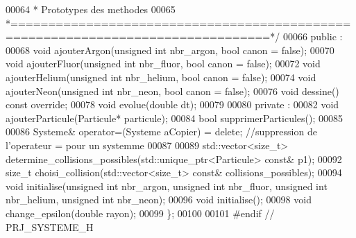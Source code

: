 \begin{DoxyCode}
00064 \textcolor{comment}{ * Prototypes des methodes}
00065 \textcolor{comment}{ *================================================================================*/}
00066     \textcolor{keyword}{public} :
00068     \textcolor{keywordtype}{void} ajouterArgon(\textcolor{keywordtype}{unsigned} \textcolor{keywordtype}{int} nbr\_argon, \textcolor{keywordtype}{bool} canon = \textcolor{keyword}{false});
00070     \textcolor{keywordtype}{void} ajouterFluor(\textcolor{keywordtype}{unsigned} \textcolor{keywordtype}{int} nbr\_fluor, \textcolor{keywordtype}{bool} canon = \textcolor{keyword}{false});
00072     \textcolor{keywordtype}{void} ajouterHelium(\textcolor{keywordtype}{unsigned} \textcolor{keywordtype}{int} nbr\_helium, \textcolor{keywordtype}{bool} canon = \textcolor{keyword}{false});
00074     \textcolor{keywordtype}{void} ajouterNeon(\textcolor{keywordtype}{unsigned} \textcolor{keywordtype}{int} nbr\_neon, \textcolor{keywordtype}{bool} canon = \textcolor{keyword}{false});
00076     \textcolor{keywordtype}{void} dessine() \textcolor{keyword}{const override};
00078     \textcolor{keywordtype}{void} evolue(\textcolor{keywordtype}{double} dt);
00079 
00080     \textcolor{keyword}{private} :
00082     \textcolor{keywordtype}{void} ajouterParticule(Particule* particule);
00084     \textcolor{keywordtype}{bool} supprimerParticules();
00085     
00086     Systeme& operator=(Systeme aCopier) = \textcolor{keyword}{delete}; \textcolor{comment}{//suppression de l'operateur = pour un systemme}
00087     
00089     std::vector<size\_t> determine\_collisions\_possibles(std::unique\_ptr<Particule> \textcolor{keyword}{const}& p1);
00092     \textcolor{keywordtype}{size\_t} choisi\_collision(std::vector<size\_t> \textcolor{keyword}{const}& collisions\_possibles);
00094     \textcolor{keywordtype}{void} initialise(\textcolor{keywordtype}{unsigned} \textcolor{keywordtype}{int} nbr\_argon, \textcolor{keywordtype}{unsigned} \textcolor{keywordtype}{int} nbr\_fluor, \textcolor{keywordtype}{unsigned} \textcolor{keywordtype}{int} nbr\_helium, \textcolor{keywordtype}{unsigned} \textcolor{keywordtype}{int} 
      nbr\_neon);
00096     \textcolor{keywordtype}{void} initialise();
00098     \textcolor{keywordtype}{void} change\_epsilon(\textcolor{keywordtype}{double} rayon);
00099 \};
00100 
00101 \textcolor{preprocessor}{#endif // PRJ\_SYSTEME\_H}
\end{DoxyCode}
